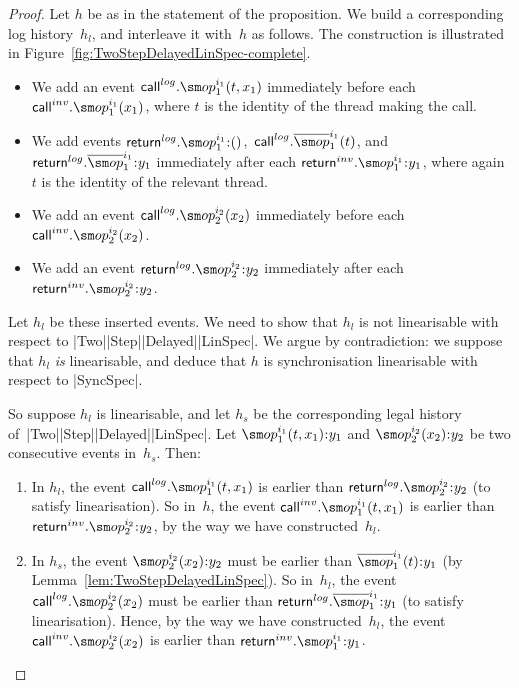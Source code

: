 \begin{proof}
Let $h$ be as in the statement of the proposition.  We build a corresponding
log history~$h_l$, and interleave it with~$h$ as follows.  The construction is
illustrated in Figure~\ref{fig:TwoStepDelayedLinSpec-complete}.
%
\begin{itemize}
\item We add an event $\call^{log}.\op_1^{i_1}(t,x_1)$ immediately before
  each $\call^{inv}.\op_1^{i_1}(x_1)$, where $t$ is the identity of the
  thread making the call.

\item We add events $\return^{log}.\op_1^{i_1} \:: ()$,\,
  $\call^{log}.\overline{\op}_1^{i_1}(t)$, and
  $\return^{log}.\overline{\op}_1^{i_1} \:: y_1$ immediately after each
  $\return^{inv}.\op_1^{i_1} \:: y_1$, where again $t$ is the identity of the
  relevant thread.

\item We add an event $\call^{log}.\op_2^{i_2}(x_2)$ immediately before
  each $\call^{inv}.\op_2^{i_2}(x_2)$.

\item We add an event $\return^{log}.\op_2^{i_2} \:: y_2$ immediately after
  each  $\return^{inv}.\op_2^{i_2} \:: y_2$.

\end{itemize}
%
Let $h_l$ be these inserted events.  We need to show that $h_l$ is not
linearisable with respect to |Two|\-|Step|\-|Delayed|\-|LinSpec|.  We argue by
contradiction: we suppose that $h_l$ \emph{is} linearisable, and deduce that
$h$ is synchronisation linearisable with respect to |SyncSpec|.

So suppose $h_l$ is linearisable, and let $h_s$ be the corresponding legal
history of~|Two|\-|Step|\-|Delayed|\-|LinSpec|.  
%
Let $\op_1^{i_1}(t,x_1)\::y_1$ and $\op_2^{i_2}(x_2)\::y_2$ be two consecutive
events in~$h_s$.  Then:
%
\begin{enumerate}
\item In $h_l$, the event $\call^{log}.\op_1^{i_1}(t,x_1)$ is earlier than
  $\return^{log}.\op_2^{i_2} \:: y_2$ (to satisfy linearisation).  So in~$h$,
  the event $\call^{inv}.\op_1^{i_1}(t,x_1)$ is earlier than
  $\return^{inv}.\op_2^{i_2} \:: y_2$, by the way we have constructed~$h_l$.  

\item In $h_s$, the event $\op_2^{i_2}(x_2)\::y_2$ must be earlier than
  $\overline\op_1^{i_1}(t)\::y_1$ (by Lemma~\ref{lem:TwoStepDelayedLinSpec}).
  So in~$h_l$, the event $\call^{log}.\op_2^{i_2}(x_2)$ must be earlier than
  $\return^{log}.\overline{\op}_1^{i_1} \:: y_1$ (to satisfy linearisation).
  Hence, by the way we have constructed~$h_l$, the event
  $\call^{inv}.\op_2^{i_2}(x_2)$ is earlier than $\return^{inv}.\op_1^{i_1}
  \:: y_1$.


\end{enumerate}
\end{proof}
